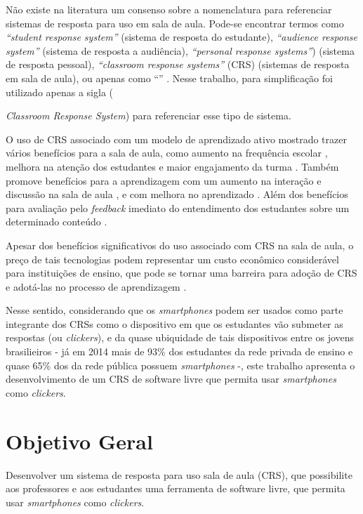 Não existe na literatura um consenso sobre a nomenclatura para referenciar sistemas de
resposta para uso em sala de aula. Pode-se encontrar termos como
{\textit{``student response system''}} (sistema de resposta do estudante),
{\textit{``audience response system''}} (sistema de resposta a audiência),
{\textit{``personal response systems''})} (sistema de resposta pessoal),
{\textit{``classroom response systems''} (CRS)} (sistemas de resposta em sala de aula),
ou apenas como {``\clickers''} \cite{Hunsu2016}.
Nesse trabalho, para simplificação foi utilizado apenas a sigla {\clicker} ({\textit{Classroom Response System})
para referenciar esse tipo de sistema.

O uso de CRS associado com um modelo de aprendizado ativo mostrado
trazer vários benefícios para a sala de aula, como aumento na frequência escolar \cite{Fotaris2016},
melhora na atenção dos estudantes \cite{Terrion2012} e maior engajamento da turma \cite{Kaya2016}.
Também promove benefícios para a aprendizagem com um aumento na interação e discussão na sala de aula \cite{Mattos2015, Barragues2011},
e com melhora no aprendizado \cite{sun2014, Hunsu2016}. Além dos
benefícios para avaliação pelo \textit{feedback} imediato do entendimento dos estudantes
sobre um determinado conteúdo  \cite{Rana2016, Blood2013}.

Apesar dos benefícios significativos do uso associado com CRS na sala de aula,
o preço de tais tecnologias podem representar um custo econômico considerável
para instituições de ensino, que pode se tornar uma barreira para adoção de CRS e
adotá-las no processo de aprendizagem \cite{Blasco-Arcas2013}.

Nesse sentido, considerando que os \textit{smartphones} podem ser usados
como parte integrante dos CRSs como o dispositivo em que os estudantes vão submeter as respostas (ou \textit{clickers}),
e da quase ubiquidade de tais dispositivos entre os jovens brasilieiros - já em 2014 mais de 93\% dos estudantes da rede
privada de ensino e quase 65\% dos da rede pública possuem \textit{smartphones} \cite[p. 55]{IBGE2016} -,
este trabalho apresenta o desenvolvimento de um CRS de software livre que permita usar
{\textit{smartphones}} como \textit{clickers}.

\section{Objetivo Geral}
Desenvolver um sistema de resposta para uso sala de aula (CRS),
que possibilite aos professores e aos estudantes uma ferramenta de software livre,
que permita usar {\textit{smartphones}} como \textit{clickers}.

}
